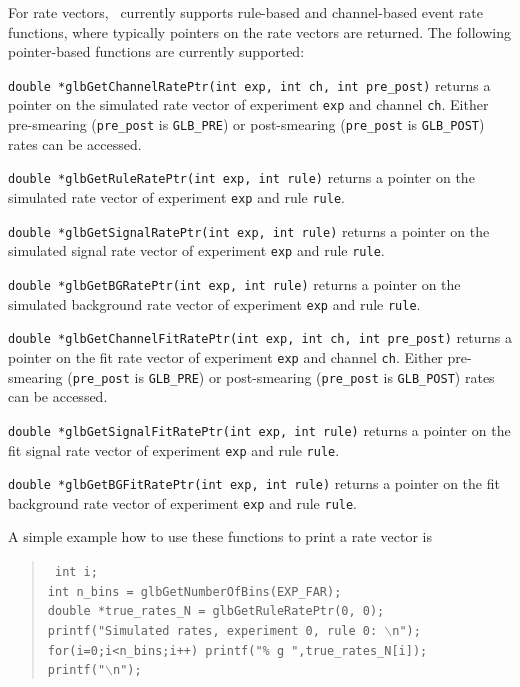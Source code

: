 For rate vectors, \GLOBES\ currently supports rule-based and channel-based event rate functions, where typically pointers on the rate vectors are returned. The following pointer-based functions are currently supported:
\begin{function}
{\tt double *glbGetChannelRatePtr(int exp, int ch, int pre\_post)} returns a 
pointer on the simulated rate vector of experiment {\tt exp} and channel {\tt ch}. Either
pre-smearing ({\tt pre\_post} is {\tt GLB\_PRE}) or post-smearing ({\tt pre\_post} is {\tt GLB\_POST})
rates can be accessed.
\end{function}
\begin{function}
{\tt double *glbGetRuleRatePtr(int exp, int rule)} returns a 
pointer on the simulated rate vector of experiment {\tt exp} and rule {\tt rule}.
\end{function}
\begin{function}
{\tt double *glbGetSignalRatePtr(int exp, int rule)} returns a 
pointer on the simulated signal rate vector of experiment {\tt exp} and rule {\tt rule}.
\end{function}
\begin{function}
{\tt double *glbGetBGRatePtr(int exp, int rule)} returns a 
pointer on the simulated background rate vector of experiment {\tt exp} and rule {\tt rule}.
\end{function}
\begin{function}
{\tt double *glbGetChannelFitRatePtr(int exp, int ch, int pre\_post)} returns a 
pointer on the fit rate vector of experiment {\tt exp} and channel {\tt ch}. Either
pre-smearing ({\tt pre\_post} is {\tt GLB\_PRE}) or post-smearing ({\tt pre\_post} is {\tt GLB\_POST})
rates can be accessed.
\end{function}
\begin{function}
{\tt double *glbGetSignalFitRatePtr(int exp, int rule)} returns a 
pointer on the fit signal rate vector of experiment {\tt exp} and rule {\tt rule}.
\end{function}
\begin{function}
{\tt double *glbGetBGFitRatePtr(int exp, int rule)} returns a 
pointer on the fit background rate vector of experiment {\tt exp} and rule {\tt rule}.
\end{function}
A simple example how to use these functions to print a rate vector is
\begin{quote}
{\tt
 int i; \\
   int n\_bins = glbGetNumberOfBins(EXP\_FAR); \\
  double *true\_rates\_N = glbGetRuleRatePtr(0, 0); \\
  printf("Simulated rates, experiment 0, rule 0: $\backslash$n"); \\
  for(i=0;i<n\_bins;i++) printf("\% g ",true\_rates\_N[i]); \\
  printf("$\backslash$n");
}
\end{quote}

